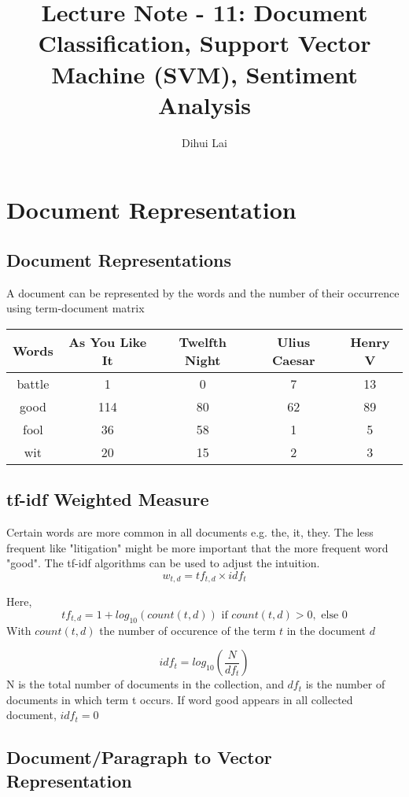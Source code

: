 \documentclass[12pt, oneside]{article}
\title{Lecture Note - 11: Document Classification, Support Vector Machine (SVM), Sentiment Analysis}
\author{Dihui Lai}
\begin{document}
\maketitle
\tableofcontents

\vspace{.25in}


\section{Document Representation}

\subsection{Document Representations}
A document can be represented by the words and the number of their occurrence using term-document matrix
\begin{center}
 \begin{tabular}{c c c c c} 
 \hline
 Words & As You Like It& Twelfth Night& Ulius Caesar& Henry V\\ [0.5ex] 
 \hline\hline
 battle & 1 & 0 & 7 &13 \\ 
 \hline
 good & 114 & 80 &62 & 89\\
 \hline
 fool & 36 & 58 & 1 & 5 \\
 \hline
 wit & 20 & 15 & 2 & 3 \\
 \hline
\end{tabular}
\end{center}



\subsection{tf-idf Weighted Measure}
Certain words are more common in all documents e.g. the, it, they. The less frequent like "litigation" might be more important that the more frequent word "good". The tf-idf algorithms can be used to adjust the intuition.
$$
w_{t,d} = tf_{t,d}\times idf_{t}
$$

Here,
$$
tf_{t, d}=1 + log_{10}(count(t, d)) \text{ if } count(t, d) > 0, \text{ else } 0
$$
With $count(t, d)$  the number of occurence of the term $t$ in the document $d$

$$
idf_{t}=log_{10}\left(\frac{N}{df_t}\right)
$$ 
N is the total number of documents in the collection, and $df_t$ is the number of documents in which term t occurs. If word good appears in all collected document, $idf_t=0$


\subsection{Document/Paragraph to Vector Representation}
\end{document}
